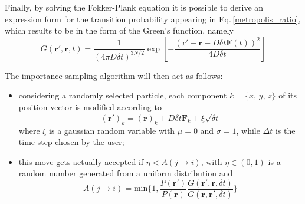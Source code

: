 Finally, by solving the Fokker-Plank equation it is possible to derive an expression form for the transition probability appearing in Eq.\,\ref{metropolis_ratio}, which results to be in the form of the Green's function, namely
\begin{equation*}
    G(\bm{r}', \bm{r}, t) = \frac{1}{\left (4 \pi D \delta t\right)^{3N/2}} \exp \left[ - \frac{ \left( \bm{r}' - \bm{r} - D\delta t \bm{F}(t)\right)^2}{4D\delta t}  \right]
\end{equation*}

The importance sampling algorithm will then act as follows:
\begin{itemize}
    \item considering a randomly selected particle, each  component $k = \{x,\,y,\,z\}$ of its position vector is modified according to
    \begin{equation*}
        (\bm{r}')_k = (\bm{r})_k + D \delta t \bm{F}_k + \xi \sqrt{\delta t}
    \end{equation*}
    where $\xi$ is a gaussian random variable with $\mu = 0$ and $\sigma=1$, while $\Delta t$ is the time step chosen by the user;
    \item this move gets actually accepted if $\eta < A(j\rightarrow i)$, with $\eta \in (0,1)$ is a random number generated from a uniform distribution and
    \begin{equation*}
        A(j \rightarrow i) = \text{min} \bigg\{ 1, \frac{P(\bm{r}')}{P(\bm{r})} \frac{G(\bm{r}', \bm{r}, \delta t)}{G(\bm{r}, \bm{r}', \delta t)} \bigg\}
    \end{equation*}
\end{itemize}



